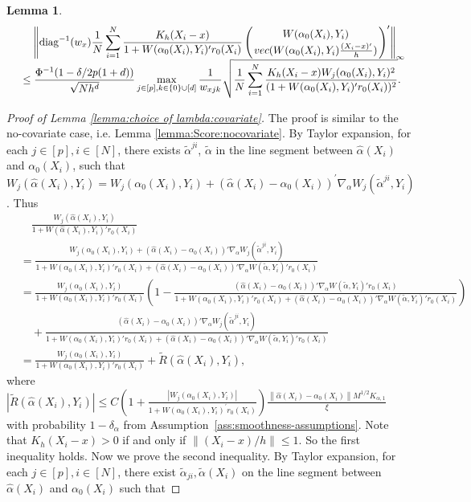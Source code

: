 \documentclass[11pt]{article}
\newtheorem{lemma}{Lemma}
\newcommand{\norm}[1]{\left\lVert #1 \right\rVert}
\begin{document}
\begin{lemma}
$$\begin{array}{rl}
&\displaystyle\quad\left\|\mathrm{diag}^{-1}(w_x)\frac{1}{N}\sum_{i=1}^N\frac{  K_h(X_i-x) }{1+W(\alpha_0(X_i),Y_i)^\prime r_0(X_i)} \left( { W(\alpha_0(X_i),Y_i)}\atop{ {\rm vec}( W(\alpha_0(X_i),Y_i)\frac{(X_i-x)'}{h} )}\right)^\prime \right\|_\infty \\
&\displaystyle\leq\frac{\Phi^{-1}(1-\delta/2p(1+d))}{\sqrt{Nh^d}}\max_{j\in[p],k\in\{0\}\cup[d]}\frac{1}{w_{xjk}}\sqrt{\frac{1}{N}\sum_{i=1}^N\frac{K_h(X_i-x)W_j(\alpha_0(X_i),Y_i)^2}{(1+W(\alpha_0(X_i),Y_i)^\prime  r_0(X_i))^2}}.
\end{array}$$
\end{lemma}
\begin{proof}[Proof of Lemma \ref{lemma:choice of lambda:covariate}]
The proof is similar to the no-covariate case, i.e. Lemma \ref{lemma:Score:nocovariate}. 
By Taylor expansion, for each $j\in[p],i\in[N]$, there exists $\tilde{\alpha}^{ji}$, $\tilde{\alpha}$ in the line segment between $\hat{\alpha}(X_i)$ and $\alpha_0(X_i)$, such that 
$W_j(\hat{\alpha}(X_i),Y_i)=W_j(\alpha_0(X_i),Y_i)+(\hat{\alpha}(X_i)-\alpha_0(X_i))^\prime\nabla_{\alpha}W_j(\tilde{\alpha}^{ji},Y_i)$. Thus 
$$
\begin{array}{rl}
&\displaystyle\quad\frac{W_j(\hat\alpha(X_i),Y_i)}{1+W(\hat\alpha(X_i),Y_i)'r_0(X_i)}\\
&\displaystyle= \frac{W_j(\alpha_0(X_i),Y_i) +   (\hat\alpha(X_i)-\alpha_0(X_i))'\nabla_\alpha W_j(\tilde \alpha^{ji},Y_i)}{1+W(\alpha_0(X_i),Y_i)'r_0(X_i) + (\hat\alpha(X_i)-\alpha_0(X_i))'\nabla_\alpha W(\tilde{\alpha},Y_i)'r_0(X_i)} \\
&\displaystyle= \frac{W_j(\alpha_0(X_i),Y_i) }{1+W(\alpha_0(X_i),Y_i)'r_0(X_i)}\!\!\left(\!1\! - \!\frac{(\hat\alpha(X_i)-\alpha_0(X_i))'\nabla_\alpha W(\tilde \alpha,Y_i)'r_0(X_i)}{1+W(\alpha_0(X_i),Y_i)'r_0(X_i) + (\hat\alpha(X_i)-\alpha_0(X_i))'\nabla_\alpha W(\tilde{\alpha},Y_i)'r_0(X_i)}\!\right)\\
&\displaystyle\quad+\frac{(\hat\alpha(X_i)-\alpha_0(X_i))'\nabla_\alpha W_j(\tilde \alpha^{ji},Y_i)}{1+W(\alpha_0(X_i),Y_i)'r_0(X_i) + (\hat\alpha(X_i)-\alpha_0(X_i))'\nabla_\alpha W(\tilde{\alpha},Y_i)'r_0(X_i)}\\
&\displaystyle = \frac{W_j(\alpha_0(X_i),Y_i) }{1+W(\alpha_0(X_i),Y_i)'r_0(X_i)} + \widetilde R(\hat\alpha(X_i),Y_i),
\end{array}$$ 
where $\displaystyle|\widetilde R(\hat\alpha(X_i),Y_i)|\leq C\left(1+\frac{|W_j(\alpha_0(X_i),Y_i)|}{1+W(\alpha_0(X_i),Y_i)^\prime r_0(X_i)}\right)\frac{\norm{\hat{\alpha}(X_i)-\alpha_0(X_i)}M^{1/2}K_{\alpha,1}}{\xi}$ with probability $1-\delta_{\alpha}$ from Assumption~\ref{ass:smoothness-assumptions}. Note that $K_h(X_i-x)>0$ if and only if $\norm{(X_i-x)/h}\leq1$. So the first inequality holds. Now we prove the second inequality. By Taylor expansion, for each $j\in[p],i\in[N]$, there exist $\tilde{\alpha}_{ji},\tilde{\alpha}(X_i)$ on the line segment between $\hat{\alpha}(X_i)$ and $\alpha_0(X_i)$ such that 

\end{proof}
\end{document}
